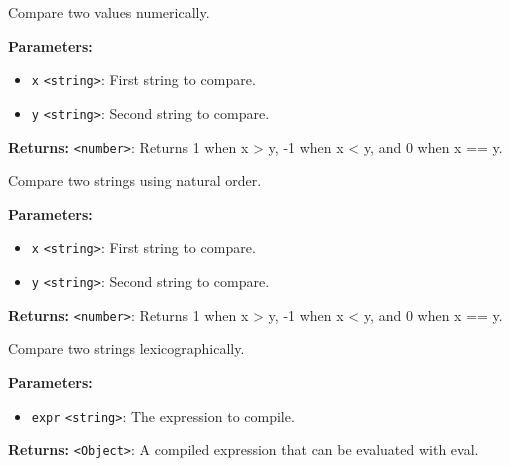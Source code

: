 \documentclass[12pt,a4paper]{article}
\begin{document}
\noindent Compare two values numerically.

\vspace{5mm}
\noindent {}


\noindent \textbf{Parameters:}
\begin{itemize}
  \item \texttt{x} \texttt{<string>}: First string to compare.
  \item \texttt{y} \texttt{<string>}: Second string to compare.
\end{itemize}

\noindent \textbf{Returns:} \texttt{<number>}: Returns 1 when x > y, -1 when x < y, and 0 when x == y.

\noindent Compare two strings using natural order.

\vspace{5mm}
\noindent {}


\noindent \textbf{Parameters:}
\begin{itemize}
  \item \texttt{x} \texttt{<string>}: First string to compare.
  \item \texttt{y} \texttt{<string>}: Second string to compare.
\end{itemize}

\noindent \textbf{Returns:} \texttt{<number>}: Returns 1 when x > y, -1 when x < y, and 0 when x == y.

\noindent Compare two strings lexicographically.

\vspace{5mm}
\noindent {}


\noindent \textbf{Parameters:}
\begin{itemize}
  \item \texttt{expr} \texttt{<string>}: The expression to compile.
\end{itemize}

\noindent \textbf{Returns:} \texttt{<Object>}: A compiled expression that can be evaluated with \textasciigrave{}eval\textasciigrave{}.
\end{document}
